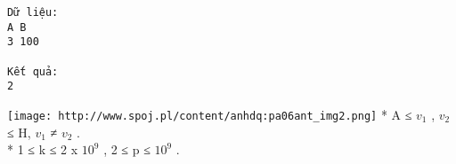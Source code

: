\begin{verbatim}
Dữ liệu:
A B
3 100

Kết quả:
2
\end{verbatim}


\texttt{[image: http://www.spoj.pl/content/anhdq:pa06ant\_img2.png]}
* A ≤ $v_{1}$   , $v_{2}$   ≤ H, $v_{1}$   ≠ $v_{2}$   .   
\\   * 1 ≤ k ≤ 2 x $10^{9}$   , 2 ≤ p ≤ $10^{9}$   .   
\\